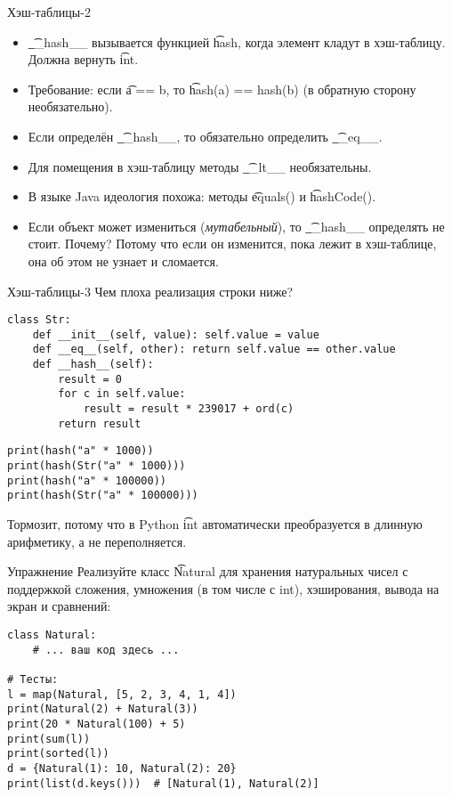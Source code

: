 \begin{frame}{Хэш-таблицы-2}
	\begin{itemize}
		\item
			\t{\_\_hash\_\_} вызывается функцией \t{hash}, когда элемент кладут в хэш-таблицу.
			Должна вернуть \t{int}.
		\item
			Требование: если \t{a == b}, то \t{hash(a) == hash(b)} (в обратную сторону необязательно).
		\item
			Если определён \t{\_\_hash\_\_}, то обязательно определить \t{\_\_eq\_\_}.
		\item
			Для помещения в хэш-таблицу методы \t{\_\_lt\_\_} необязательны.
		\item
			В языке Java идеология похожа: методы \t{equals()} и \t{hashCode()}.
		\item
			Если объект может измениться (\textit{мутабельный}), то \t{\_\_hash\_\_} определять не стоит.
			Почему?
			\pause
			Потому что если он изменится, пока лежит в хэш-таблице, она об этом не узнает и сломается.
	\end{itemize}
\end{frame}

\begin{frame}[fragile]{Хэш-таблицы-3}
	Чем плоха реализация строки ниже?
\begin{verbatim}
class Str:
    def __init__(self, value): self.value = value
    def __eq__(self, other): return self.value == other.value
    def __hash__(self):
        result = 0
        for c in self.value:
            result = result * 239017 + ord(c)
        return result
\end{verbatim}
	\pause
\begin{verbatim}
print(hash("a" * 1000))
print(hash(Str("a" * 1000)))
print(hash("a" * 100000))
print(hash(Str("a" * 100000)))
\end{verbatim}
	\pause
	Тормозит, потому что в Python \t{int} автоматически преобразуется в длинную арифметику,
	а не переполняется.
\end{frame}

\begin{frame}[fragile]{Упражнение}
	Реализуйте класс \t{Natural} для хранения натуральных чисел с поддержкой сложения, умножения (в том числе с int), хэширования, вывода на экран и сравнений:
\begin{verbatim}
class Natural:
    # ... ваш код здесь ...

# Тесты:
l = map(Natural, [5, 2, 3, 4, 1, 4])
print(Natural(2) + Natural(3))
print(20 * Natural(100) + 5)
print(sum(l))
print(sorted(l))
d = {Natural(1): 10, Natural(2): 20}
print(list(d.keys()))  # [Natural(1), Natural(2)]
\end{verbatim}
\end{frame}
